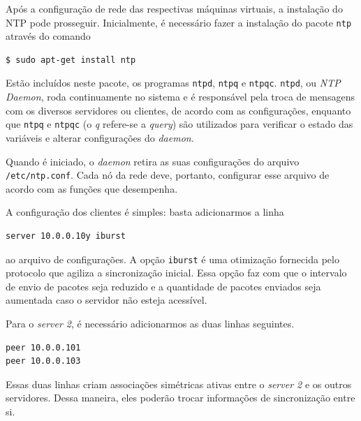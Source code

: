 \vspace{12pt}

Após a configuração de rede das respectivas máquinas virtuais, a instalação do
NTP pode prosseguir. Inicialmente, é necessário fazer a instalação do pacote
\texttt{ntp} através do comando

\begin{lstlisting}[language=bash, style=nonumbers]
$ sudo apt-get install ntp
\end{lstlisting}

Estão incluídos neste pacote, os programas \texttt{ntpd}, \texttt{ntpq}
e \texttt{ntpqc}. \texttt{ntpd}, ou \textit{NTP Daemon}, roda continuamente no
sistema e é responsável pela troca de mensagens com os diversos servidores
ou clientes, de acordo com as configurações, enquanto que \texttt{ntpq}
e \texttt{ntpqc} (o \textit{q} refere-se a \textit{query}) são utilizados para
verificar o estado das variáveis e alterar configurações do \textit{daemon}. 

\vspace{12pt}

Quando é iniciado, o \textit{daemon} retira as suas configurações do arquivo
\texttt{/etc/ntp.conf}. Cada nó da rede deve, portanto,
configurar esse arquivo de acordo com as funções que desempenha.

\vspace{12pt}

A configuração dos clientes é simples: basta adicionarmos a linha

\begin{lstlisting}[language=bash, style=nonumbers]
server 10.0.0.10y iburst
\end{lstlisting}

ao arquivo de configurações. A opção \texttt{iburst} é uma otimização fornecida
pelo protocolo que agiliza a sincronização inicial. Essa opção faz com que o
intervalo de envio de pacotes seja reduzido e a quantidade de pacotes
enviados seja aumentada caso o servidor não esteja acessível. 

\vspace{12pt}

Para o \textit{server 2}, é necessário adicionarmos as duas linhas seguintes.

\begin{lstlisting}[language=bash, style=nonumbers]
peer 10.0.0.101
peer 10.0.0.103
\end{lstlisting}

Essas duas linhas criam associações simétricas ativas entre o \textit{server 2}
e os outros servidores. Dessa maneira, eles poderão trocar informações de
sincronização entre si.

